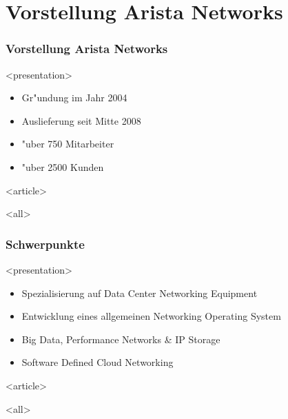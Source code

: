
\section{Vorstellung Arista Networks}

\begin{frame}[fragile]
\frametitle<presentation>{Vorstellung Arista Networks}




\mode
<presentation>
\begin{itemize}
\item Gr"undung im Jahr 2004
\item Auslieferung seit Mitte 2008
\item "uber 750 Mitarbeiter
\item "uber 2500 Kunden
\end{itemize}

\mode
<article>

\mode
<all>

\end{frame}
\newpage

\begin{frame}[fragile]
\frametitle<presentation>{Schwerpunkte}

 
\mode
<presentation>

\begin{itemize}
\item Spezialisierung auf Data Center Networking Equipment
\item Entwicklung eines allgemeinen Networking Operating System
\item Big Data, Performance Networks \& IP Storage
\item Software Defined Cloud Networking
\end{itemize}


\mode
<article>

\mode
<all>

\end{frame}
\newpage

\clearpage
